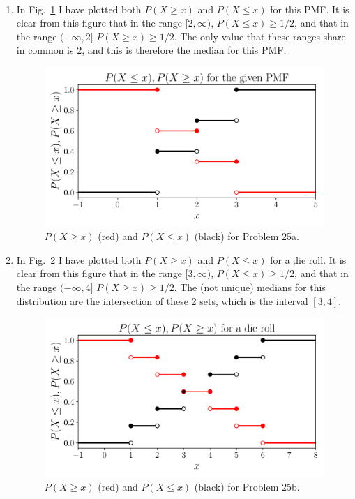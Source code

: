 \begin{problem}{25} $ $

\begin{enumerate}
\item In Fig.~\ref{fig:prob_25} I have plotted both $P(X \ge x)$ and $P(X \le x)$ for this PMF.  It is clear from this figure that in the range $[2, \infty)$, $P(X \le x) \ge 1/2$, and that in the range $(-\infty, 2]$ $P(X \ge x) \ge 1/2$.  The only value that these ranges share in common is 2, and this is therefore the median for this PMF.

	\begin{figure}[t]
	\centering
      		 \includegraphics[totalheight=6cm]{chpt3/prob25.pdf}
  			  \caption{$P(X \ge x)$ (red) and $P(X \le x)$ (black) for Problem 25a.}
    			   \label{fig:prob_25}
	\end{figure}
	
\item In Fig.~\ref{fig:prob_25b} I have plotted both $P(X \ge x)$ and $P(X \le x)$ for a die roll.  It is clear from this figure that in the range $[3, \infty)$, $P(X \le x) \ge 1/2$, and that in the range $(-\infty, 4]$ $P(X \ge x) \ge 1/2$.  The (not unique) medians for this distribution are the intersection of these 2 sets, which is the interval $[3, 4]$.

	\begin{figure}[t]
	\centering
      		 \includegraphics[totalheight=6cm]{chpt3/prob25b.pdf}
  			  \caption{$P(X \ge x)$ (red) and $P(X \le x)$ (black) for Problem 25b.}
    			   \label{fig:prob_25b}
	\end{figure}
	

\end{enumerate}
\end{problem}
